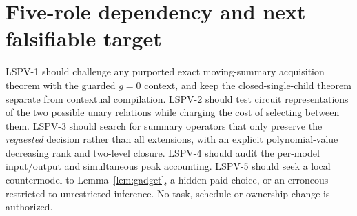 \documentclass[11pt]{article}
\begin{document}
\section{Five-role dependency and next falsifiable target}
LSPV-1 should challenge any purported exact moving-summary acquisition theorem with the guarded $g=0$ context, and keep the closed-single-child theorem separate from contextual compilation. LSPV-2 should test circuit representations of the two possible unary relations while charging the cost of selecting between them. LSPV-3 should search for summary operators that only preserve the \emph{requested} decision rather than all extensions, with an explicit polynomial-value decreasing rank and two-level closure. LSPV-4 should audit the per-model input/output and simultaneous peak accounting. LSPV-5 should seek a local countermodel to Lemma~\ref{lem:gadget}, a hidden paid choice, or an erroneous restricted-to-unrestricted inference. No task, schedule or ownership change is authorized.



\end{document}
